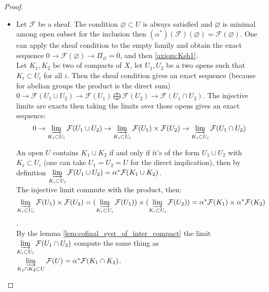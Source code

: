 \begin{proof}
    \begin{itemize}
        \item Let $\mathcal{F}$ be a sheaf. The condition $\varnothing \subset U$ is always satisfied and $\varnothing$ is minimal among open subset for the inclusion then $(\alpha^*)(\mathcal{F})(\varnothing)=\mathcal{F}(\varnothing)$. One can apply the sheaf condition to the empty family and obtain the exact sequence $0\to \mathcal{F}(\varnothing)\to \Pi_{\varnothing}=0$, and then \eqref{axiom:Ksh1}.\\

        Let $K_1,K_2$ be two of compacts of $X$, let $U_1,U_2$ be a two opens such that $K_i\subset U_i$ for all $i$. Then the sheaf condition gives an exact sequence (because for abelian groups the product is the direct sum) $0\to \mathcal{F}(U_1\cup U_2)\to \mathcal{F}(U_1)\bigoplus\mathcal{F}(U_2)\to \mathcal{F}(U_1\cap U_2)$. The injective limits are exacts then taking the limits over those opens gives an exact sequence: 
        \begin{equation}\label{lim_of_sheaf_cond}
            0\to \varinjlim\limits_{K_i\subset U_i}\mathcal{F}(U_1\cup U_2)\to \varinjlim\limits_{K_i\subset U_i}\mathcal{F}(U_1)\times\mathcal{F}(U_2)\to \varinjlim\limits_{K_i\subset U_i}\mathcal{F}(U_1\cap U_2)
        \end{equation}

        An open $U$ contains $K_1\cup K_2$ if and only if it's of the form $U_1\cup U_2$ with $K_i\subset U_i$ (one can take $U_1=U_2=U$ for the direct implication), then by definition $\varinjlim\limits_{K_i\subset U_i}\mathcal{F}(U_1\cup U_2)=\alpha^*\mathcal{F}(K_1\cup K_2)$.\\
        
        The injective limit commute with the product, then: \[\varinjlim\limits_{K_i\subset U_i}\mathcal{F}(U_1)\times\mathcal{F}(U_2)=(\varinjlim\limits_{K_i\subset U_i}\mathcal{F}(U_1))\times(\varinjlim\limits_{K_i\subset U_i}\mathcal{F}(U_2))=\alpha^*\mathcal{F}(K_1)\times\alpha^*\mathcal{F}(K_2)\].\\
        
        By the lemma \ref{lem:cofinal_syst_of_inter_compact} the limit $\varinjlim\limits_{K_i\subset U_i}\mathcal{F}(U_1\cap U_2)$ compute the same thing as $\varinjlim\limits_{K_1\cap K_2\subset U}\mathcal{F}(U)=\alpha^*\mathcal{F}(K_1\cap K_2)$.\\


\end{itemize}
\end{proof}
